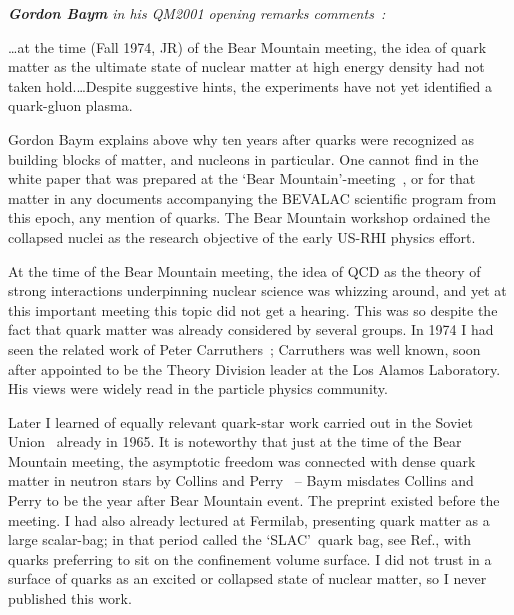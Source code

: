 \noindent\textit{\textbf{Gordon Baym} in his QM2001 opening remarks comments~\cite{Baym:2001in}:}\\[-0.7cm]
\begin{mdframed}[linecolor=gray,roundcorner=12pt,backgroundcolor=GreenYellow!15,linewidth=1pt,leftmargin=0cm,rightmargin=0cm,topline=true,bottomline=true,skipabove=12pt]\relax%
% 
 \ldots at the time (Fall 1974, JR) of the Bear Mountain meeting, the idea of quark matter as the ultimate state of nuclear matter at high energy density had not taken hold.\ldots Despite suggestive hints, the experiments have not yet identified a quark-gluon plasma.
 \end{mdframed} 
%
Gordon Baym explains above why ten years after quarks were recognized as building blocks of matter, and nucleons in particular. One cannot find in the white paper that was prepared at the \lq Bear Mountain\rq-meeting~\cite{BearMountain}, or for that matter in any documents accompanying the BEVALAC scientific program from this epoch, any mention of quarks. The Bear Mountain workshop ordained the collapsed nuclei as the research objective of the early US-RHI physics effort. 

At the time of the Bear Mountain meeting, the idea of QCD as the theory of strong interactions underpinning nuclear science was whizzing around, and yet at this important meeting this topic did not get a hearing. This was so despite the fact that quark matter was already considered by several groups. In 1974 I had seen the related work of Peter Carruthers~\cite{Carruthers:74}; Carruthers was well known, soon after appointed to be the Theory Division leader at the Los Alamos Laboratory. His views were widely read in the particle physics community.

Later I learned of equally relevant quark-star work carried out in the Soviet Union~\cite{Ivanenko:1965dg} already in 1965. It is noteworthy that just at the time of the Bear Mountain meeting, the asymptotic freedom was connected with dense quark matter in neutron stars by Collins and Perry~\cite{Collins:1974ky} -- Baym misdates Collins and Perry to be the year after Bear Mountain event. The preprint existed before the meeting. I had also already lectured at Fermilab, presenting quark matter as a large scalar-bag; in that period called the \lq SLAC\rq\ quark bag, see Ref.\cite{Lee:1980book}, with quarks preferring to sit on the confinement volume surface. I did not trust in a surface of quarks as an excited or collapsed state of nuclear matter, so I never published this work.


